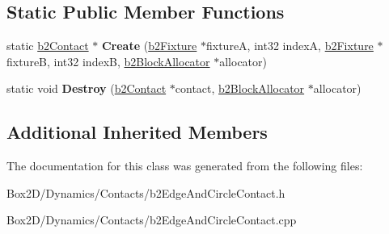 \subsection*{Static Public Member Functions}
\begin{DoxyCompactItemize}
\item 
\mbox{\label{classb2_edge_and_circle_contact_a1b4a2a1d4098288c84a7778a4949d0f0}} 
static \hyperlink{classb2_contact}{b2\+Contact} $\ast$ {\bfseries Create} (\hyperlink{classb2_fixture}{b2\+Fixture} $\ast$fixtureA, int32 indexA, \hyperlink{classb2_fixture}{b2\+Fixture} $\ast$fixtureB, int32 indexB, \hyperlink{classb2_block_allocator}{b2\+Block\+Allocator} $\ast$allocator)
\item 
\mbox{\label{classb2_edge_and_circle_contact_a123eeb8144b01fc15c1318eacd0da4ca}} 
static void {\bfseries Destroy} (\hyperlink{classb2_contact}{b2\+Contact} $\ast$contact, \hyperlink{classb2_block_allocator}{b2\+Block\+Allocator} $\ast$allocator)
\end{DoxyCompactItemize}
\subsection*{Additional Inherited Members}


The documentation for this class was generated from the following files\+:\begin{DoxyCompactItemize}
\item 
Box2\+D/\+Dynamics/\+Contacts/b2\+Edge\+And\+Circle\+Contact.\+h\item 
Box2\+D/\+Dynamics/\+Contacts/b2\+Edge\+And\+Circle\+Contact.\+cpp\end{DoxyCompactItemize}
